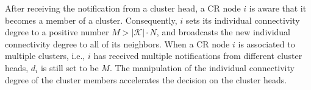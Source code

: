 \documentclass[times]{ettauth}
\newcommand{\ie}{i.e., }
\theoremstyle{mytheoremstyle}
\newtheorem{theorem}{Theorem}[section]
\theoremstyle{mytheoremstyle}
\theoremstyle{mytheoremstyle}
\begin{document}
After receiving the notification from a cluster head, a CR node $i$ is aware that it becomes a member of a cluster. 
Consequently, $i$ sets its individual connectivity degree to a positive number $M > |\mathcal{K}| \cdot N$, and broadcasts the new individual connectivity degree to all of its neighbors. 
When a CR node $i$ is associated to multiple clusters, \ie $i$ has received multiple notifications from different cluster heads, $d_i$ is still set to be $M$. 
The manipulation of the individual connectivity degree of the cluster members accelerates the decision on the cluster heads.

	
\end{document}
